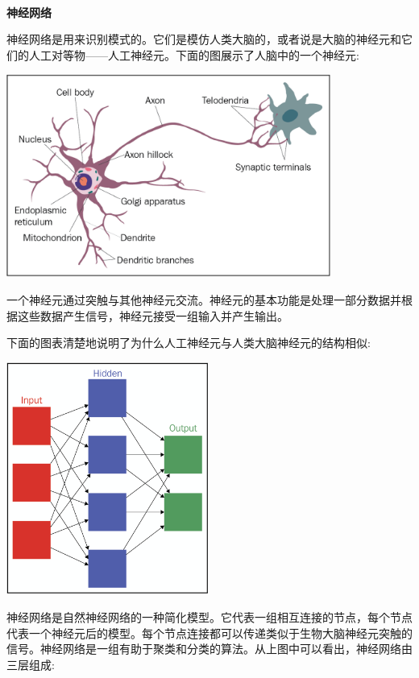 \noindent\textbf{}\ \par
\textbf{神经网络} \ \par
神经网络是用来识别模式的。它们是模仿人类大脑的，或者说是大脑的神经元和它们的人工对等物——人工神经元。下面的图展示了人脑中的一个神经元: \par

\begin{center}
	\includegraphics[width=0.8\textwidth]{content/Section-3/Chapter-15/9}
\end{center}

一个神经元通过突触与其他神经元交流。神经元的基本功能是处理一部分数据并根据这些数据产生信号，神经元接受一组输入并产生输出。 \par
下面的图表清楚地说明了为什么人工神经元与人类大脑神经元的结构相似: \par

\begin{center}
	\includegraphics[width=0.5\textwidth]{content/Section-3/Chapter-15/10}
\end{center}

神经网络是自然神经网络的一种简化模型。它代表一组相互连接的节点，每个节点代表一个神经元后的模型。每个节点连接都可以传递类似于生物大脑神经元突触的信号。神经网络是一组有助于聚类和分类的算法。从上图中可以看出，神经网络由三层组成: \par

